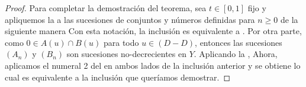 \begin{proof}
Para completar la demostración del teorema, sea $t\in[0,1]$ fijo y apliquemos la  
a las sucesiones de conjuntos y números definidas para $n\geq0$ de la siguiente manera
Con esta notación, la inclusión  es equivalente a .
Por otra parte, como $0\in A(u)\cap B(u)$ para todo $u\in (D-D)$,
entonces las sucesiones $(A_n)$ y $(B_n)$ son sucesiones no-decrecientes en $Y$.
Aplicando la , 
Ahora, aplicamos el numeral 2 del  en ambos lados de la inclusión anterior y se obtiene
lo cual es equivalente a la inclusión  que queríamos demostrar.
\end{proof}

